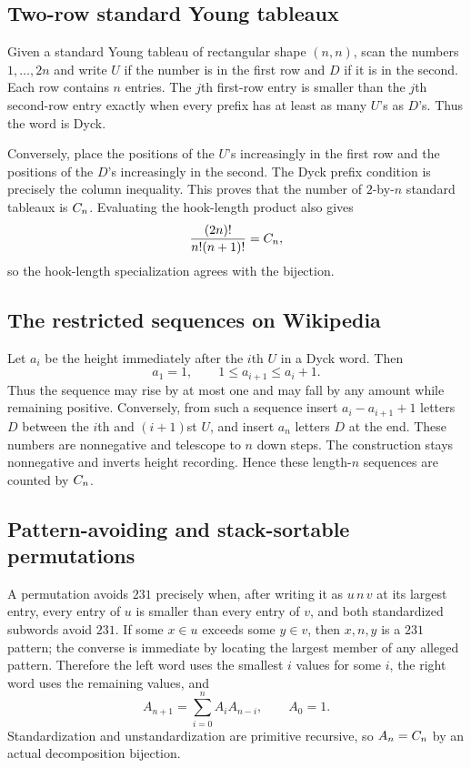 \subsection{Two-row standard Young tableaux}

Given a standard Young tableau of rectangular shape $(n,n)$, scan the numbers
$1,\ldots,2n$ and write $U$ if the number is in the first row and $D$ if it is
in the second.  Each row contains $n$ entries.  The $j$th first-row entry is
smaller than the $j$th second-row entry exactly when every prefix has at least
as many $U$'s as $D$'s.  Thus the word is Dyck.

Conversely, place the positions of the $U$'s increasingly in the first row and
the positions of the $D$'s increasingly in the second.  The Dyck prefix
condition is precisely the column inequality.  This proves that the number of
$2$-by-$n$ standard tableaux is $C_n$.  Evaluating the hook-length product
also gives
\[
 \frac{(2n)!}{n!(n+1)!}=C_n,
\]
so the hook-length specialization agrees with the bijection.

\subsection{The restricted sequences on Wikipedia}

Let $a_i$ be the height immediately after the $i$th $U$ in a Dyck word.  Then
\[
 a_1=1,
 \qquad 1\le a_{i+1}\le a_i+1.                                  \tag{3.6}\label{eq:restricted-seq}
\]
Thus the sequence may rise by at most one and may fall by any amount while
remaining positive.  Conversely, from such a sequence insert
$a_i-a_{i+1}+1$ letters $D$ between the $i$th and $(i+1)$st $U$, and insert
$a_n$ letters $D$ at the end.  These numbers are nonnegative and telescope to
$n$ down steps.  The construction stays nonnegative and inverts height
recording.  Hence these length-$n$ sequences are counted by $C_n$.

\subsection{Pattern-avoiding and stack-sortable permutations}

A permutation avoids $231$ precisely when, after writing it as $u\,n\,v$ at
its largest entry, every entry of $u$ is smaller than every entry of $v$, and
both standardized subwords avoid $231$.  If some $x\in u$ exceeds some
$y\in v$, then $x,n,y$ is a $231$ pattern; the converse is immediate by
locating the largest member of any alleged pattern.  Therefore the left word
uses the smallest $i$ values for some $i$, the right word uses the remaining
values, and
\[
 A_{n+1}=\sum_{i=0}^{n}A_iA_{n-i},\qquad A_0=1.                  \tag{3.7}
\]
Standardization and unstandardization are primitive recursive, so
$A_n=C_n$ by an actual decomposition bijection.

